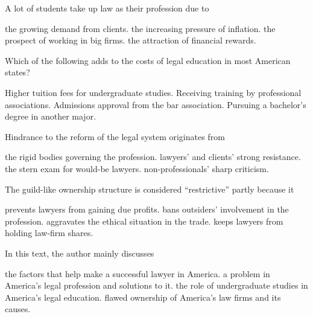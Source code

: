 \item A lot of students take up law as their profession due to
\begin{tasks}
	\task the growing demand from clients.
	\task the increasing pressure of inflation.
	\task the prospect of working in big firms.
	\task the attraction of financial rewards.
\end{tasks}
\item Which of the following adds to the costs of legal education in most American states?
\begin{tasks}
	\task Higher tuition fees for undergraduate studies.
	\task Receiving training by professional associations.
	\task Admissions approval from the bar association.
	\task Pursuing a bachelor's degree in another major.
\end{tasks}
\item Hindrance to the reform of the legal system originates from
\begin{tasks}
	\task the rigid bodies governing the profession.
	\task lawyers' and clients' strong resistance.
	\task the stern exam for would-be lawyers.
	\task non-professionals' sharp criticism.
\end{tasks}
\item The guild-like ownership structure is considered ``restrictive'' partly because it
\begin{tasks}
	\task prevents lawyers from gaining due profits.
	\task bans outsiders' involvement in the profession.
	\task aggravates the ethical situation in the trade.
	\task keeps lawyers from holding law-firm shares.
\end{tasks}
\item In this text, the author mainly discusses
\begin{tasks}
	\task the factors that help make a successful lawyer in America.
	\task a problem in America's legal profession and solutions to it.
	\task the role of undergraduate studies in America's legal education.
	\task flawed ownership of America's law firms and its causes.
\end{tasks}